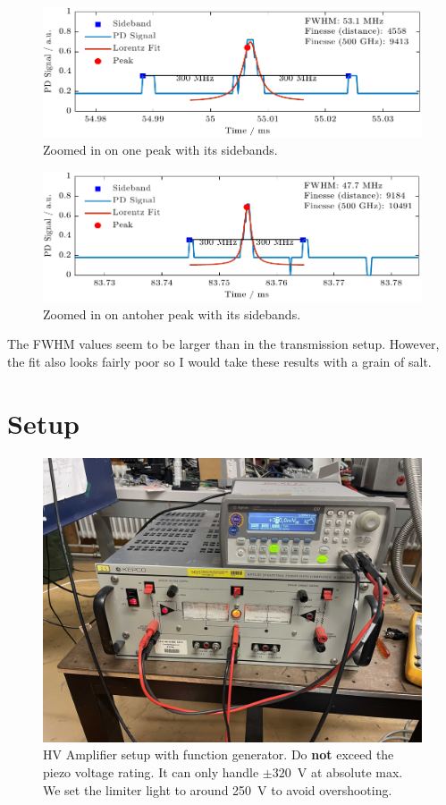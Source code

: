 \documentclass[a4paper,11pt]{article}
\begin{document}
\begin{figure}[htbp]
    \centering
    \includegraphics[width=\textwidth]{back/Figure_6.pdf}
    \caption{Zoomed in on one peak with its sidebands.}
\end{figure}
\begin{figure}[htbp]
    \centering
    \includegraphics[width=\textwidth]{back/Figure_8.pdf}
    \caption{Zoomed in on antoher peak with its sidebands.}
\end{figure}

The FWHM values seem to be larger than in the transmission setup. However, the fit also looks fairly poor so I would take these results with a grain of salt.

\newpage
\section{Setup}
\begin{figure}[htbp]
    \centering
    \includegraphics[width=\textwidth]{IMG_8997.jpg}
    \caption{HV Amplifier setup with function generator. Do \textbf{not} exceed the piezo voltage rating. It can only handle $\pm 320$~V at absolute max. We set the limiter light to around 250~V to avoid overshooting.}
\end{figure}
\end{document}

